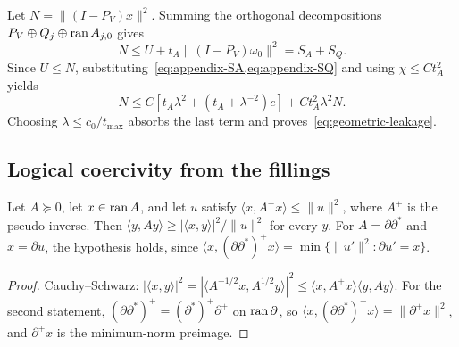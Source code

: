 Let \(N=\|(I-P_V)x\|^2\). Summing the orthogonal decompositions \(P_V\oplus Q_j\oplus\operatorname{ran} A_{j,0}\) gives
\[
N\le U+t_A\|(I-P_V)\omega_0\|^2=S_A+S_Q.
\]
Since \(U\le N\), substituting~\cref{eq:appendix-SA,eq:appendix-SQ} and using \(\chi\le Ct_A^2\) yields
\[
N\le C\left[t_A\lambda^2+(t_A+\lambda^{-2})e\right]
+Ct_A^2\lambda^2N.
\]
Choosing \(\lambda\le c_0/t_{\max}\) absorbs the last term and proves~\cref{eq:geometric-leakage}.

\subsection{Logical coercivity from the fillings}
\label{app:logical-coercivity}

\begin{lemma}
\label{lem:filling-domination}
Let \(A\succeq0\), let \(x\in\operatorname{ran} A\), and let \(u\) satisfy
\(\langle x,A^{+}x\rangle\le\|u\|^2\), where \(A^+\) is the pseudo-inverse.
Then \(\langle y,Ay\rangle\ge|\langle x,y\rangle|^2/\|u\|^2\) for every
\(y\).  For \(A=\partial\partial^*\) and \(x=\partial u\), the hypothesis holds,
since \(\langle x,(\partial\partial^*)^+x\rangle=\min\{\|u'\|^2:\partial u'=x\}\).
\end{lemma}

\begin{proof}
Cauchy--Schwarz:
\(|\langle x,y\rangle|^2=|\langle A^{+1/2}x,A^{1/2}y\rangle|^2
\le\langle x,A^+x\rangle\langle y,Ay\rangle\).
For the second statement, \((\partial\partial^*)^{+}=(\partial^*)^{+}\partial^{+}\)
on \(\operatorname{ran}\partial\), so \(\langle x,(\partial\partial^*)^+x\rangle=\|\partial^+x\|^2\),
and \(\partial^+x\) is the minimum-norm preimage.
\end{proof}

